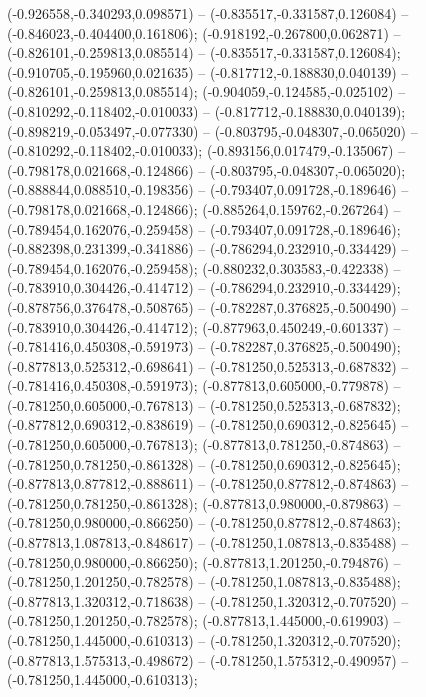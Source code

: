  (-0.926558,-0.340293,0.098571) -- (-0.835517,-0.331587,0.126084) -- (-0.846023,-0.404400,0.161806);
 (-0.918192,-0.267800,0.062871) -- (-0.826101,-0.259813,0.085514) -- (-0.835517,-0.331587,0.126084);
 (-0.910705,-0.195960,0.021635) -- (-0.817712,-0.188830,0.040139) -- (-0.826101,-0.259813,0.085514);
 (-0.904059,-0.124585,-0.025102) -- (-0.810292,-0.118402,-0.010033) -- (-0.817712,-0.188830,0.040139);
 (-0.898219,-0.053497,-0.077330) -- (-0.803795,-0.048307,-0.065020) -- (-0.810292,-0.118402,-0.010033);
 (-0.893156,0.017479,-0.135067) -- (-0.798178,0.021668,-0.124866) -- (-0.803795,-0.048307,-0.065020);
 (-0.888844,0.088510,-0.198356) -- (-0.793407,0.091728,-0.189646) -- (-0.798178,0.021668,-0.124866);
 (-0.885264,0.159762,-0.267264) -- (-0.789454,0.162076,-0.259458) -- (-0.793407,0.091728,-0.189646);
 (-0.882398,0.231399,-0.341886) -- (-0.786294,0.232910,-0.334429) -- (-0.789454,0.162076,-0.259458);
 (-0.880232,0.303583,-0.422338) -- (-0.783910,0.304426,-0.414712) -- (-0.786294,0.232910,-0.334429);
 (-0.878756,0.376478,-0.508765) -- (-0.782287,0.376825,-0.500490) -- (-0.783910,0.304426,-0.414712);
 (-0.877963,0.450249,-0.601337) -- (-0.781416,0.450308,-0.591973) -- (-0.782287,0.376825,-0.500490);
 (-0.877813,0.525312,-0.698641) -- (-0.781250,0.525313,-0.687832) -- (-0.781416,0.450308,-0.591973);
 (-0.877813,0.605000,-0.779878) -- (-0.781250,0.605000,-0.767813) -- (-0.781250,0.525313,-0.687832);
 (-0.877812,0.690312,-0.838619) -- (-0.781250,0.690312,-0.825645) -- (-0.781250,0.605000,-0.767813);
 (-0.877813,0.781250,-0.874863) -- (-0.781250,0.781250,-0.861328) -- (-0.781250,0.690312,-0.825645);
 (-0.877813,0.877812,-0.888611) -- (-0.781250,0.877812,-0.874863) -- (-0.781250,0.781250,-0.861328);
 (-0.877813,0.980000,-0.879863) -- (-0.781250,0.980000,-0.866250) -- (-0.781250,0.877812,-0.874863);
 (-0.877813,1.087813,-0.848617) -- (-0.781250,1.087813,-0.835488) -- (-0.781250,0.980000,-0.866250);
 (-0.877813,1.201250,-0.794876) -- (-0.781250,1.201250,-0.782578) -- (-0.781250,1.087813,-0.835488);
 (-0.877813,1.320312,-0.718638) -- (-0.781250,1.320312,-0.707520) -- (-0.781250,1.201250,-0.782578);
 (-0.877813,1.445000,-0.619903) -- (-0.781250,1.445000,-0.610313) -- (-0.781250,1.320312,-0.707520);
 (-0.877813,1.575313,-0.498672) -- (-0.781250,1.575312,-0.490957) -- (-0.781250,1.445000,-0.610313);
